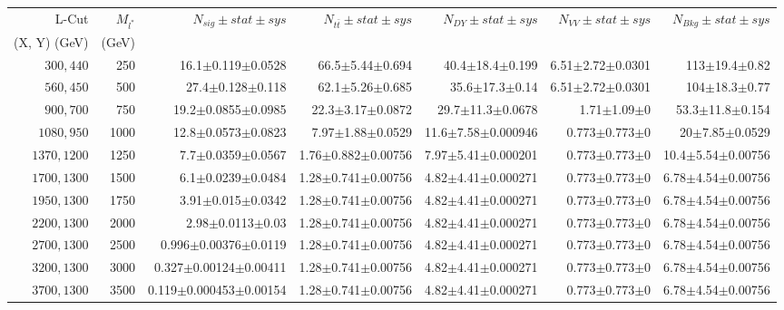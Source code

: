 \documentclass[]{article}
\begin{document}
\begin{table}
\begin{center}
\scriptsize{
\begin{tabular}{ |r|r|r|r|r|r|r|}
\hline 
L-Cut & $M_{l^*}$ & $N_{sig}\pm stat \pm sys $ &$N_{t\bar{t}}\pm stat \pm sys $ & $N_{DY}\pm stat \pm sys $ & $N_{VV}\pm stat \pm sys $ &$N_{Bkg}\pm stat \pm sys$\\
 (X, Y) (GeV) & (GeV) & && &&\\
\hline 
$300, 440$ & 250 & 16.1$\pm$0.119$\pm$0.0528 & 66.5$\pm$5.44$\pm$0.694 & 40.4$\pm$18.4$\pm$0.199 & 6.51$\pm$2.72$\pm$0.0301 & 113$\pm$19.4$\pm$0.82 \\
$560, 450$ & 500 & 27.4$\pm$0.128$\pm$0.118 & 62.1$\pm$5.26$\pm$0.685 & 35.6$\pm$17.3$\pm$0.14 & 6.51$\pm$2.72$\pm$0.0301 & 104$\pm$18.3$\pm$0.77 \\
$900, 700$ & 750 & 19.2$\pm$0.0855$\pm$0.0985 & 22.3$\pm$3.17$\pm$0.0872 & 29.7$\pm$11.3$\pm$0.0678 & 1.71$\pm$1.09$\pm$0 & 53.3$\pm$11.8$\pm$0.154 \\
$1080,950$ & 1000 & 12.8$\pm$0.0573$\pm$0.0823 & 7.97$\pm$1.88$\pm$0.0529 & 11.6$\pm$7.58$\pm$0.000946 & 0.773$\pm$0.773$\pm$0 & 20$\pm$7.85$\pm$0.0529 \\
$1370,1200$ & 1250 & 7.7$\pm$0.0359$\pm$0.0567 & 1.76$\pm$0.882$\pm$0.00756 & 7.97$\pm$5.41$\pm$0.000201 & 0.773$\pm$0.773$\pm$0 & 10.4$\pm$5.54$\pm$0.00756 \\
$1700,1300$ & 1500 & 6.1$\pm$0.0239$\pm$0.0484 & 1.28$\pm$0.741$\pm$0.00756 & 4.82$\pm$4.41$\pm$0.000271 & 0.773$\pm$0.773$\pm$0 & 6.78$\pm$4.54$\pm$0.00756 \\
$1950,1300$ & 1750 & 3.91$\pm$0.015$\pm$0.0342 & 1.28$\pm$0.741$\pm$0.00756 & 4.82$\pm$4.41$\pm$0.000271 & 0.773$\pm$0.773$\pm$0 & 6.78$\pm$4.54$\pm$0.00756 \\
$2200,1300$ & 2000 & 2.98$\pm$0.0113$\pm$0.03 & 1.28$\pm$0.741$\pm$0.00756 & 4.82$\pm$4.41$\pm$0.000271 & 0.773$\pm$0.773$\pm$0 & 6.78$\pm$4.54$\pm$0.00756 \\
$2700,1300$ & 2500 & 0.996$\pm$0.00376$\pm$0.0119 & 1.28$\pm$0.741$\pm$0.00756 & 4.82$\pm$4.41$\pm$0.000271 & 0.773$\pm$0.773$\pm$0 & 6.78$\pm$4.54$\pm$0.00756 \\
$3200,1300$ & 3000 & 0.327$\pm$0.00124$\pm$0.00411 & 1.28$\pm$0.741$\pm$0.00756 & 4.82$\pm$4.41$\pm$0.000271 & 0.773$\pm$0.773$\pm$0 & 6.78$\pm$4.54$\pm$0.00756 \\
$3700,1300$ & 3500 & 0.119$\pm$0.000453$\pm$0.00154 & 1.28$\pm$0.741$\pm$0.00756 & 4.82$\pm$4.41$\pm$0.000271 & 0.773$\pm$0.773$\pm$0 & 6.78$\pm$4.54$\pm$0.00756 \\

\end{tabular}}
\end{center}
\end{table}
\end{document}
